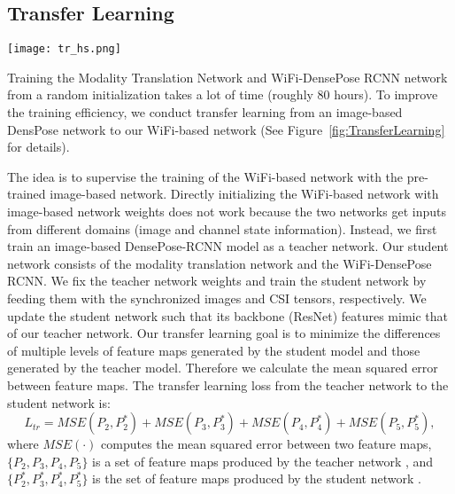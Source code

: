 \documentclass[sigconf, anonymous=false]{acmart}
\newcommand{\dong}[1]{\textcolor{green}{[Dong: #1]}}
\begin{document}
  
\subsection{Transfer Learning}
  
\begin{figure*}[!htb]
    \centering
    \texttt{[image: tr\_hs.png]} 
    \caption{Transfer learning from an image-based teacher network to our WiFi-based network.}
    
    \label{fig:TransferLearning}%
\end{figure*}
  
Training the Modality Translation Network and WiFi-DensePose RCNN network from a random initialization takes a lot of time (roughly 80 hours). To improve the training efficiency, we conduct transfer learning from an image-based DensPose network to our WiFi-based network (See Figure~\ref{fig:TransferLearning} for details). 
  
The idea is to supervise the training of the WiFi-based network with the pre-trained image-based network. Directly initializing the WiFi-based network with image-based network weights does not work because the two networks get inputs from different domains (image and channel state information). Instead, we first train an image-based DensePose-RCNN model as a teacher network.  Our student network consists of the modality translation network and the WiFi-DensePose RCNN. We fix the teacher network weights and train the student network by feeding them with the synchronized images and CSI tensors, respectively. We update the student network such that its backbone (ResNet) features mimic that of our teacher network. Our transfer learning goal is to minimize the differences of multiple levels of feature maps generated by the student model and those generated by the teacher model. Therefore we calculate the mean squared error between feature maps. The transfer learning loss from the teacher network to the student network is:
\begin{equation}
    L_{tr} = MSE(P_2, P^{*}_2) + MSE(P_3, P^{*}_3) + MSE(P_4 , P^{*}_4) + MSE(P_5, P^{*}_5),
\end{equation}
where $MSE(\cdot)$ computes the mean squared error between two feature maps, $\{P_2, P_3, P_4, P_5\}$ is a set of feature maps produced by the teacher network \cite{Resnet-fpn}, and $\{P^{*}_2, P^{*}_3, P^{*}_4, P^{*}_5\}$ is the set of feature maps produced by the student network \cite{Resnet-fpn}.
\end{document}
